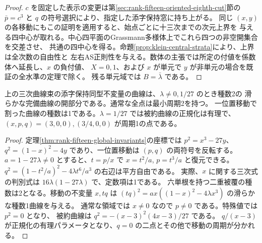 \begin{proof}
$c$ を固定した表示の変更は第\ref{sec:rank-fifteen-oriented-eighth-cut}節の
$\bar p=c^3$ と $q$ の符号選択により、指定した添字保持窓に持ち上がる。
同じ $(x,y)$ の各移動にもこの証明を適用すると、始点ごとに十三次までの次元上界を
与える四中心が取れる。中心四平面のGrassmann多様体上でこれら四つの非空開集合を交差させ、
共通の四中心を得る。命題\ref{prop:klein-central-strata}により、上界は全次数の自由性と
左右AS正則性を与える。数体の主張では所定の付値を係数体へ延長し、$x$ の負付値、
$X=0,1$、および $x$ が単元で $y$ が非単元の場合を既証の全水準の定理で除く。
残る単元域では $B=\bar\lambda$ である。
\end{proof}

\begin{corollary}
上の三次曲線束の添字保持同型不変量の曲線は、$\lambda\ne0,1/27$ のとき種数2の
滑らかな完備曲線の開部分である。通常な全点は最小周期2を持つ。
一位置移動で割った曲線の種数は1である。$\lambda=1/27$ では被約曲線の正規化は有理で、
$(x,p,q)=(3,0,0),(3/4,0,0)$ が周期1の点である。
\end{corollary}
\begin{proof}
定理\ref{thm:rank-fifteen-global-invariants}の座標では $p^2=x^3-27y$、
$q^2=(1-x)^2-4y$ であり、一位置移動は $(p,q)$ の両符号を反転する。
$a=1-27\lambda\ne0$ とすると、$t=p/x$ で $x=t^2/a$, $p=t^3/a$ と復元できる。
$q^2=(1-t^2/a)^2-4\lambda t^6/a^3$ の右辺は平方自由である。
実際、$x$ に関する三次式の判別式は $16\lambda(1-27\lambda)$ で、定数項は1である。
六単根を持つ二重被覆の種数は2となる。移動の不変量 $x,tq$ は
$(tq)^2=ax((1-x)^2-4\lambda x^3)$ の滑らかな種数1曲線を与える。
通常な領域では $x\ne0$ なので $p\ne0$ である。特殊値では $p^2=0$ となり、
被約曲線は $q^2=-(x-3)^2(4x-3)/27$ である。
$q/(x-3)$ が正規化の有理パラメータとなり、$q=0$ の二点とその他で移動の周期が分かれる。
\end{proof}
